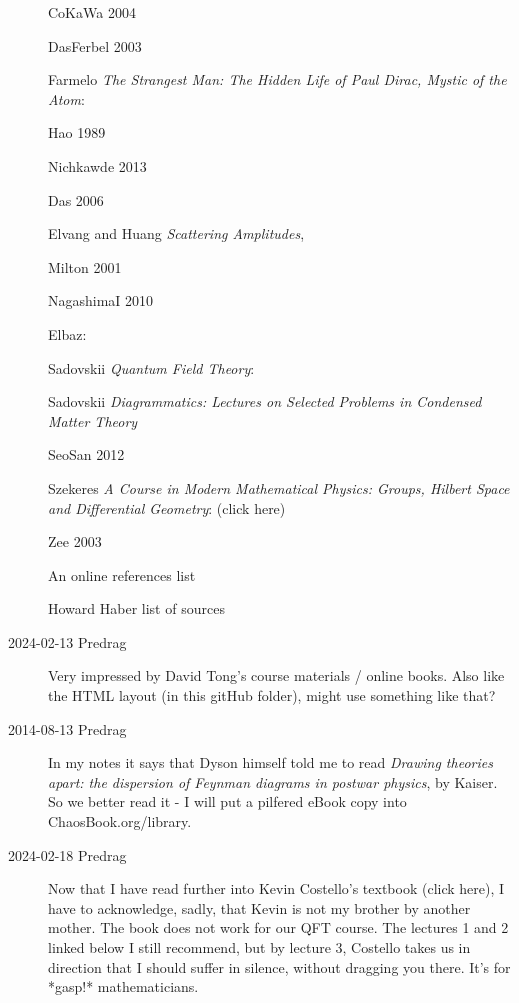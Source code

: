 \begin{description}
CoKaWa 2004 

DasFerbel 2003 

Farmelo
{\em The Strangest Man: The Hidden Life of Paul Dirac, Mystic of the Atom}:

Hao 1989 

Nichkawde 2013 

Das 2006 

Elvang and Huang {\em Scattering Amplitudes}, 

Milton 2001 

NagashimaI 2010 

Elbaz: 

Sadovskii {\em Quantum Field Theory}:

Sadovskii
{\em Diagrammatics: Lectures on Selected Problems in Condensed Matter Theory}

SeoSan 2012 

Szekeres {\em A Course in Modern Mathematical Physics: Groups,
Hilbert Space and Differential Geometry}:
 { (click here)}

Zee 2003 

{An online references list}

Howard Haber  {list of sources}

\item[2024-02-13 Predrag]
Very impressed by
{David Tong}'s course materials /
{online books}.
Also like the HTML layout (in this gitHub folder), might use something like that?

\item[2014-08-13 Predrag]
In my notes it says that Dyson himself told me to read {\em Drawing
theories apart: the dispersion of {Feynman} diagrams in postwar physics},
by Kaiser. So we better read it - I will put a pilfered
eBook copy 
into ChaosBook.org/library.

\item[2024-02-18 Predrag] Now that I have read further into
Kevin Costello's textbook
{(click here)},
I have to acknowledge, sadly, that Kevin is not my brother by another
mother. The book does not work for our QFT course. The lectures 1 and 2
linked below I still recommend, but by lecture 3, Costello takes us in
direction that I should suffer in silence, without dragging you there. It's for
*gasp!* mathematicians.


\end{description}
